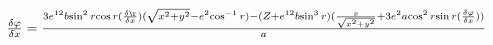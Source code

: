 \documentclass{standalone}
\begin{document}
    $\frac{\delta\varphi}{\delta x} = \frac{3e^{12} b{\sin^2 r}{\cos r} (\frac{\delta\r}{\delta x})(\sqrt{x^2+y^2} - e^2 {\cos^{-1} r}) - (Z + e^{12}b{\sin^3 r})(\frac{x}{\sqrt{x^2+y^2}} + 3e^2a{\cos^2 r}{\sin r} (\frac{\delta\varphi}{\delta x}) ) }{a}$
\end{document}
